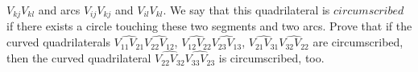 $V_{kj}V_{kl}$
 and arcs 
$V_{ij}V_{kj}$
 and 
$V_{il}V_{kl}.$
 We say that this quadrilateral is 
$circumscribed$
 if there exists a circle touching these two segments and two arcs. Prove that if the curved quadrilaterals 
$\widehat{V_{11}V_{21}}\widehat{V_{22}V_{12}}$, $ \widehat{V_{12}V_{22}}\widehat{V_{23}V_{13}}$, $\widehat{V_{21}V_{31}}\widehat{V_{32}V_{22}}$
 are circumscribed, then the curved quadrilateral 
$\widehat{V_{22}V_{32}}\widehat{V_{33}V_{23}}$
 is circumscribed, too.


